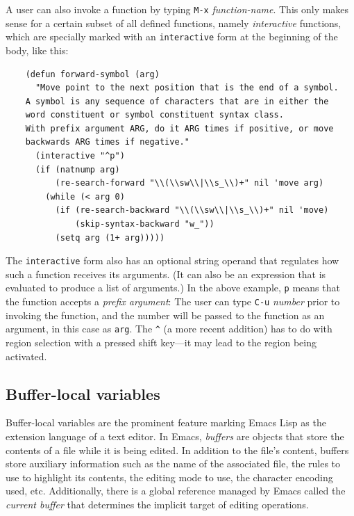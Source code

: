 \documentclass[format=acmsmall, review]{acmart}
\newcommand \Elisp {Emacs Lisp}
\begin{document}
A user can also invoke a function by typing \texttt{M-x}
\emph{function-name}.  This only makes sense for a certain subset of
all defined functions, namely \emph{interactive} functions, which
are specially marked with an \texttt{interactive} form at the
beginning of the body, like this:
\begin{verbatim}
    (defun forward-symbol (arg)
      "Move point to the next position that is the end of a symbol.
    A symbol is any sequence of characters that are in either the
    word constituent or symbol constituent syntax class.
    With prefix argument ARG, do it ARG times if positive, or move
    backwards ARG times if negative."
      (interactive "^p")
      (if (natnump arg)
          (re-search-forward "\\(\\sw\\|\\s_\\)+" nil 'move arg)
        (while (< arg 0)
          (if (re-search-backward "\\(\\sw\\|\\s_\\)+" nil 'move)
              (skip-syntax-backward "w_"))
          (setq arg (1+ arg)))))
\end{verbatim}
The \texttt{interactive} form also has an optional string operand that
regulates how such a function receives its arguments.  (It can also be
an expression that is evaluated to produce a list of arguments.)  In the above
example, \verb|p| means that the function accepts a \emph{prefix
  argument}: The user can type \texttt{C-u} \emph{number}
prior to invoking the function,
and the number will be passed to the function as an argument, in this
case as \texttt{arg}.  The \verb|^| (a more recent addition) has to do with
region selection with a pressed shift key---it may lead to the region
being activated.

\subsection{Buffer-local variables}
\label{sec:buffer-local-variables}

Buffer-local variables are the prominent feature marking \Elisp{} as the
extension language of a text editor.  In Emacs, \emph{buffers} are objects
that store the contents of a file while it is being edited.  In addition to
the file's content, buffers store auxiliary information such
as the name of the associated file, the rules to use to highlight its
contents, the editing mode to use, the character encoding used, etc.
Additionally, there is a global reference managed by Emacs called the
\emph{current buffer} that determines the implicit target of
editing operations.
\end{document}
